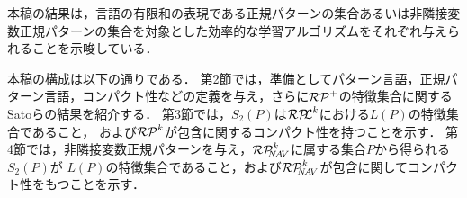 本稿の結果は，言語の有限和の表現である正規パターンの集合あるいは非隣接変数正規パターンの集合を対象とした効率的な学習アルゴリズムをそれぞれ与えられることを示唆している．

本稿の構成は以下の通りである．
第2節では，準備としてパターン言語，正規パターン言語，コンパクト性などの定義を与え，さらに$\mathcal{RP}^{+}$の特徴集合に関するSatoらの結果を紹介する．
第3節では，$S_{2}(P)$は$\mathcal{RP\!\!L}^{k}$における$L(P)$の特徴集合であること，
および$\mathcal{RP}^{k}$が包含に関するコンパクト性を持つことを示す．
第4節では，非隣接変数正規パターンを与え，$\mathcal{RP}^{k}_{\!\!\!N\!A\!V}$に属する集合$P$から得られる$S_2(P)$が
$L(P)$の特徴集合であること，および$\mathcal{RP}^{k}_{\!\!\!N\!A\!V}$が包含に関してコンパクト性をもつことを示す．
